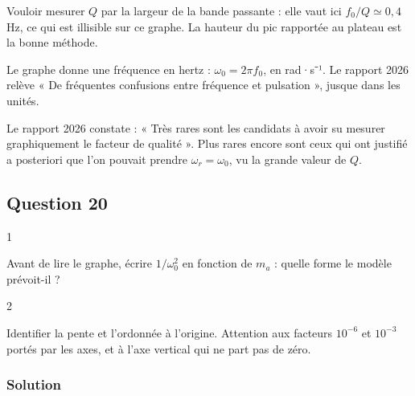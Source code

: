\documentclass[11pt,a4paper]{article}
\begin{document}
\begin{piege}

Vouloir mesurer \(Q\) par la largeur de la bande passante : elle vaut ici \(f_0/Q\simeq0{,}4\) Hz, ce qui est illisible sur ce graphe. La hauteur du pic rapportée au plateau est la bonne méthode.

\end{piege}

\begin{piege}

Le graphe donne une fréquence en hertz : \(\omega_0=2\pi f_0\), en rad·s⁻¹. Le rapport 2026 relève « De fréquentes confusions entre fréquence et pulsation », jusque dans les unités.

\end{piege}

\begin{jury}

Le rapport 2026 constate : « Très rares sont les candidats à avoir su mesurer graphiquement le facteur de qualité ». Plus rares encore sont ceux qui ont justifié a posteriori que l'on pouvait prendre \(\omega_r=\omega_0\), vu la grande valeur de \(Q\).

\end{jury}

\hypertarget{question-20}{%
\subsection{Question 20}\label{question-20}}

\begin{indication}{1}

Avant de lire le graphe, écrire \(1/\omega_0^2\) en fonction de \(m_a\) : quelle forme le modèle prévoit-il ?

\end{indication}

\begin{indication}{2}

Identifier la pente et l'ordonnée à l'origine. Attention aux facteurs \(10^{-6}\) et \(10^{-3}\) portés par les axes, et à l'axe vertical qui ne part pas de zéro.

\end{indication}

\hypertarget{solution-19}{%
\subsubsection{Solution}\label{solution-19}}
\end{document}
